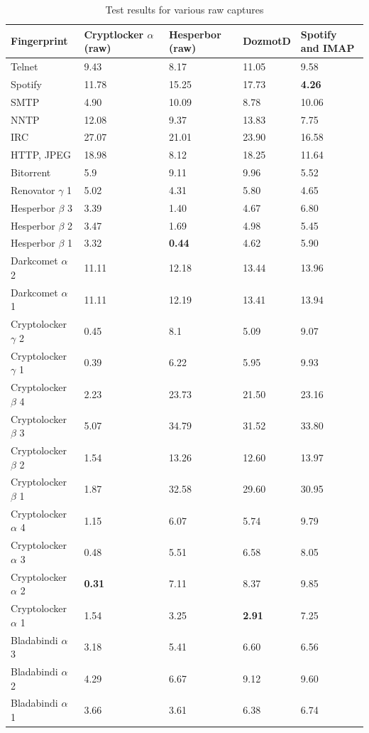 \documentclass[9pt,journal,compsoc]{IEEEtran}
\begin{document}
\begin{table}[!ht]
\renewcommand{\arraystretch}{1.15}
\caption{Test results for various raw captures}
\label{table:testresults}

\begin{tabular}{|p{1.56cm}|p{1.4cm}|p{1.3cm}|p{1.2cm}|p{1.4cm}|}
\hline
Fingerprint& \textbf{Cryptlocker $\alpha$ (raw)}&\textbf{Hesperbor (raw)}&\textbf{DozmotD}&\textbf{Spotify and IMAP}\\
\hline
Telnet&9.43&8.17&11.05&9.58\\
\hline
Spotify&11.78&15.25&17.73&\textbf{4.26}\\
\hline
SMTP&4.90 &10.09&8.78&10.06\\
\hline
NNTP&12.08&9.37&13.83&7.75\\
\hline
IRC&27.07&21.01&23.90&16.58\\
\hline
HTTP, JPEG &18.98 &8.12&18.25&11.64\\
\hline
Bitorrent &5.9 &9.11&9.96&5.52\\
\hline
Renovator $\gamma$ 1 &5.02&4.31&5.80&4.65\\
\hline
Hesperbor $\beta$ 3 &3.39&1.40&4.67&6.80\\
\hline
Hesperbor $\beta$ 2 &3.47&1.69&4.98&5.45\\
\hline
Hesperbor $\beta$ 1 &3.32&\textbf{0.44}&4.62&5.90\\
\hline
Darkcomet $\alpha$ 2 &11.11&12.18&13.44&13.96\\
\hline
Darkcomet $\alpha$ 1 & 11.11&12.19&13.41&13.94\\
\hline
Cryptolocker $\gamma$ 2 &0.45&8.1&5.09&9.07\\
\hline
Cryptolocker $\gamma$ 1&0.39&6.22&5.95&9.93\\
\hline
Cryptolocker $\beta$ 4&2.23&23.73&21.50&23.16\\
\hline
Cryptolocker $\beta$ 3 &5.07&34.79&31.52&33.80\\
\hline
Cryptolocker $\beta$ 2&1.54&13.26&12.60&13.97\\
\hline
Cryptolocker $\beta$ 1&1.87&32.58&29.60&30.95\\
\hline
Cryptolocker $\alpha$ 4&1.15&6.07&5.74&9.79\\
\hline
Cryptolocker $\alpha$ 3&0.48&5.51&6.58&8.05\\
\hline
Cryptolocker $\alpha$ 2&\textbf{0.31}&7.11&8.37&9.85\\
\hline
Cryptolocker $\alpha$ 1&1.54&3.25&\textbf{2.91}&7.25\\
\hline
Bladabindi $\alpha$ 3&3.18&5.41&6.60&6.56\\
\hline
Bladabindi $\alpha$ 2&4.29&6.67&9.12&9.60\\
\hline
Bladabindi $\alpha$ 1&3.66&3.61&6.38&6.74\\
\hline
\end{tabular}
\\  
  

\end{table}
\end{document}
